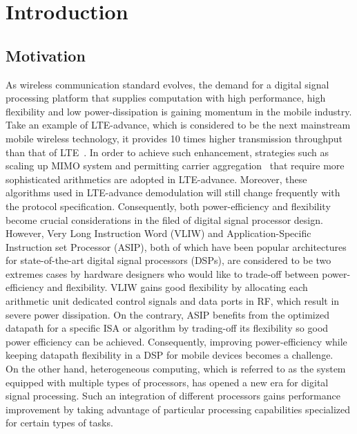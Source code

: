 \chapter{Introduction}

    \section{Motivation}
        As wireless communication standard evolves, the demand for a digital signal processing platform that supplies computation with high performance, high flexibility and low power-dissipation is gaining momentum in the mobile industry. 
        Take an example of LTE-advance, which is considered to be the next mainstream mobile wireless technology, it provides 10 times higher transmission throughput than that of LTE~\cite{lte}. 
        In order to achieve such enhancement, strategies such as scaling up MIMO system and permitting carrier aggregation~\cite{carrier} that require more sophisticated arithmetics are adopted in LTE-advance.
        Moreover, these algorithms used in LTE-advance demodulation will still change frequently with the protocol specification.
        Consequently, both power-efficiency and flexibility become crucial considerations in the filed of digital signal processor design. 
        However, Very Long Instruction Word (VLIW) and Application-Specific Instruction set Processor (ASIP), both of which have been popular architectures for state-of-the-art digital signal processors (DSPs), are considered to be two extremes cases by hardware designers who would like to trade-off between power-efficiency and flexibility. 
        VLIW gains good flexibility by allocating each arithmetic unit dedicated control signals and data ports in RF, which result in severe power dissipation. %
        On the contrary, ASIP benefits from the optimized datapath for a specific ISA or algorithm by trading-off its flexibility so good power efficiency can be achieved. 
        Consequently, improving power-efficiency while keeping datapath flexibility in a DSP for mobile devices becomes a challenge.	
        \\\indent 
        On the other hand, heterogeneous computing, which is referred to as the system equipped with multiple types of processors, has opened a new era for digital signal processing. 
        Such an integration of different processors gains performance improvement by taking advantage of particular processing capabilities specialized for certain types of tasks.

